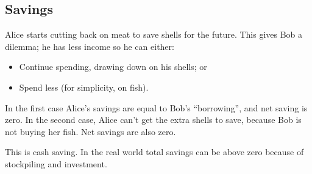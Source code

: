 
\subsection{Savings}

Alice starts cutting back on meat to save shells for the future. This gives Bob a dilemma; he has less income so he can either:

\begin{itemize}
\item Continue spending, drawing down on his shells; or
\item Spend less (for simplicity, on fish).
\end{itemize}

In the first case Alice’s savings are equal to Bob’s “borrowing”, and net saving is zero. In the second case, Alice can’t get the extra shells to save, because Bob is not buying her fish. Net savings are also zero.

This is cash saving. In the real world total savings can be above zero because of stockpiling and investment.

